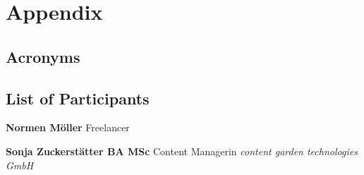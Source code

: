 \chapter{Appendix}
\section{Acronyms}\label{sec:acronyms}


\newpage
\printnoidxglossaries%

\newpage
\section{List of Participants}\label{app:ListOfParticipants}

\textbf{Normen Möller}\newline
{Freelancer}\newline
{}

\textbf{Sonja Zuckerstätter BA MSc}\newline
{Content Managerin}\newline
\textit{content garden technologies GmbH}\newline
{}

